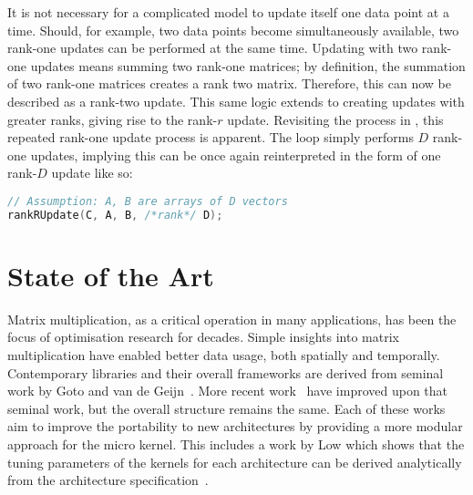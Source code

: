 \documentclass[\main/thesis.tex]{subfiles}
\begin{document}
It is not necessary for a complicated model to update itself one data point at a time.
Should, for example, two data points become simultaneously available, two rank-one updates can be performed at the same time.
Updating with two rank-one updates means summing two rank-one matrices; by definition, the summation of two rank-one matrices creates a rank two matrix\footnotemark.
Therefore, this can now be described as a rank-two update.
This same logic extends to creating updates with greater ranks, giving rise to the rank-$r$ update\footnotemark.
Revisiting the process in , this repeated rank-one update process is apparent.
The loop simply performs $D$ rank-one updates, implying this can be once again reinterpreted in the form of one rank-$D$ update like so:
\begin{lstlisting}[caption={[Matrix multiplication via rank-$r$ update]Matrix multiplication using rank-$r$ update.},label=lst:rankR,language=C++,columns=flexible,morekeywords=uint64_t]
// Assumption: A, B are arrays of D vectors
rankRUpdate(C, A, B, /*rank*/ D);
\end{lstlisting}

\section{State of the Art}
Matrix multiplication, as a critical operation in many applications, has been the focus of optimisation research for decades.
Simple insights into matrix multiplication have enabled better data usage, both spatially and temporally.
Contemporary libraries and their overall frameworks are derived from seminal work by Goto and van de Geijn~\autocite{goto2008anatomy}.
More recent work~\autocite{vanzee2015blis,zee2016blis} have improved upon that seminal work, but the overall structure remains the same.
Each of these works aim to improve the portability to new architectures by providing a more modular approach for the micro kernel.
This includes a work by Low \etal which shows that the tuning parameters of the kernels for each architecture can be derived analytically from the architecture specification~\autocite{low2016analytical}.
\end{document}
